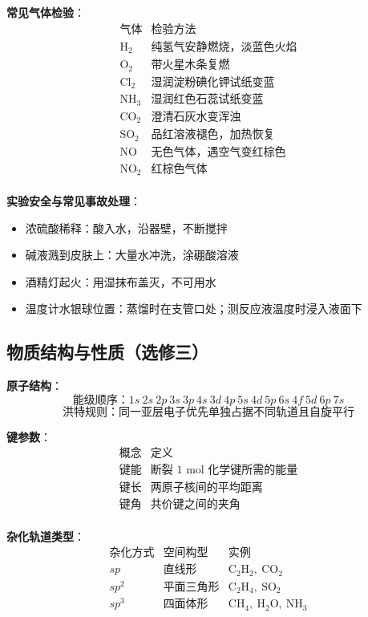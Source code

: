 \textbf{常见气体检验}：
\[
\begin{array}{c|c}
\text{气体} & \text{检验方法} \\ \hline
\text{H}_2 & \text{纯氢气安静燃烧，淡蓝色火焰} \\
\text{O}_2 & \text{带火星木条复燃} \\
\text{Cl}_2 & \text{湿润淀粉碘化钾试纸变蓝} \\
\text{NH}_3 & \text{湿润红色石蕊试纸变蓝} \\
\text{CO}_2 & \text{澄清石灰水变浑浊} \\
\text{SO}_2 & \text{品红溶液褪色，加热恢复} \\
\text{NO} & \text{无色气体，遇空气变红棕色} \\
\text{NO}_2 & \text{红棕色气体} \\
\end{array}
\]

\textbf{实验安全与常见事故处理}：
\begin{itemize}
  \item 浓硫酸稀释：酸入水，沿器壁，不断搅拌
  \item 碱液溅到皮肤上：大量水冲洗，涂硼酸溶液
  \item 酒精灯起火：用湿抹布盖灭，不可用水
  \item 温度计水银球位置：蒸馏时在支管口处；测反应液温度时浸入液面下
\end{itemize}

\subsection{物质结构与性质（选修三）}

\textbf{原子结构}：
\[
\text{能级顺序}：1s\ 2s\ 2p\ 3s\ 3p\ 4s\ 3d\ 4p\ 5s\ 4d\ 5p\ 6s\ 4f\ 5d\ 6p\ 7s
\]
\[
\text{洪特规则}：同一亚层电子优先单独占据不同轨道且自旋平行
\]

\textbf{键参数}：
\[
\begin{array}{c|c}
\text{概念} & \text{定义} \\ \hline
\text{键能} & \text{断裂 1 mol 化学键所需的能量} \\
\text{键长} & \text{两原子核间的平均距离} \\
\text{键角} & \text{共价键之间的夹角} \\
\end{array}
\]

\textbf{杂化轨道类型}：
\[
\begin{array}{c|c|c}
\text{杂化方式} & \text{空间构型} & \text{实例} \\ \hline
sp & \text{直线形} & \text{C}_2\text{H}_2,\ \text{CO}_2 \\
sp^2 & \text{平面三角形} & \text{C}_2\text{H}_4,\ \text{SO}_2 \\
sp^3 & \text{四面体形} & \text{CH}_4,\ \text{H}_2\text{O},\ \text{NH}_3 \\
\end{array}
\]

